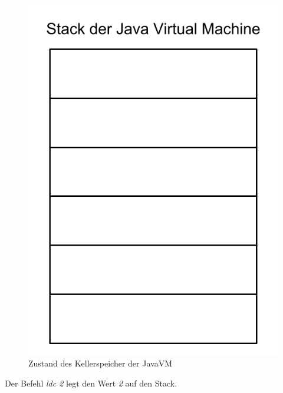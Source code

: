 \documentclass[12pt, a4paper, oneside, ngerman]{article}
\begin{document}
\begin{figure}[h!]
\centering
\includegraphics[scale=0.2]{stack_visual.png}
\caption{Zustand des Kellerspeicher der JavaVM}
\label{fig:method}
\end{figure}

Der Befehl \textit{ldc 2} legt den Wert \textit{2} auf den Stack.
\end{document}
